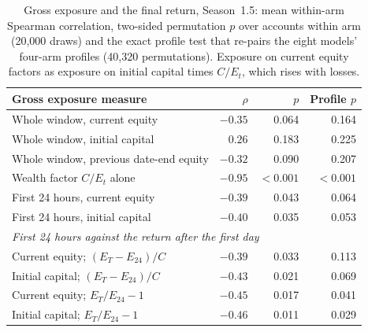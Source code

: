 \begin{table}[ht]
\centering\small
\caption{Gross exposure and the final return, Season~1.5: mean within-arm
Spearman correlation, two-sided permutation $p$ over accounts within arm
(20{,}000 draws) and the exact profile test that re-pairs the eight models'
four-arm profiles (40{,}320 permutations). Exposure on current equity
factors as exposure on initial capital times $C/E_t$, which rises with
losses.}
\label{tab:expmech}
\begin{tabular}{lrrr}
\toprule
Gross exposure measure & $\rho$ & $p$ & Profile $p$ \\
\midrule
Whole window, current equity & $-0.35$ & 0.064 & 0.164 \\
Whole window, initial capital & $0.26$ & 0.183 & 0.225 \\
Whole window, previous date-end equity & $-0.32$ & 0.090 & 0.207 \\
Wealth factor $C/E_t$ alone & $-0.95$ & $<0.001$ & $<0.001$ \\
First 24 hours, current equity & $-0.39$ & 0.043 & 0.064 \\
First 24 hours, initial capital & $-0.40$ & 0.035 & 0.053 \\
\multicolumn{4}{l}{\emph{First 24 hours against the return after the first day}} \\
Current equity; $(E_T-E_{24})/C$ & $-0.39$ & 0.033 & 0.113 \\
Initial capital; $(E_T-E_{24})/C$ & $-0.43$ & 0.021 & 0.069 \\
Current equity; $E_T/E_{24}-1$ & $-0.45$ & 0.017 & 0.041 \\
Initial capital; $E_T/E_{24}-1$ & $-0.46$ & 0.011 & 0.029 \\
\bottomrule
\end{tabular}
\end{table}

